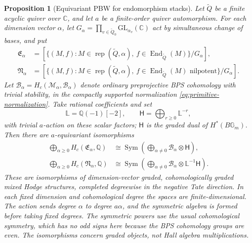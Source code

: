 \documentclass[11pt, reqno]{amsart}
\numberwithin{equation}{section}
\newtheorem{proposition}[theorem]{Proposition}
\theoremstyle{definition}
\theoremstyle{remark}
\newcommand{\op}[1]{\operatorname{#1}}
\newcommand{\mr}[1]{\mathrm{#1}}
\newcommand{\mb}[1]{\mathbb{#1}}
\newcommand{\mc}[1]{\mathcal{#1}}
\newcommand{\ms}[1]{\mathscr{#1}}
\newcommand{\End}{\op{End}}
\newcommand{\Rep}{\op{rep}}
\newcommand{\Qbar}{\widetilde Q}
\newcommand{\iso}{\cong}
\begin{document}
\begin{proposition}[Equivariant PBW for endomorphism stacks]
\label{prop:primitive-pbw}
Let $\Qbar$ be a finite acyclic quiver over $\mb C$, and let $a$
be a finite-order quiver automorphism.
For each dimension vector $\alpha$, let
$G_\alpha=\prod_{v\in\Qbar_0}\mr{GL}_{\alpha_v}(\mb C)$
act by simultaneous change of bases, and put
\begin{align*}
 \mathfrak E_\alpha
  &= [\{(M,f):M\in\Rep(\Qbar,\alpha),\ f\in\End_{\Qbar}(M)\}/G_\alpha],\\
 \mathfrak N_\alpha
  &= [\{(M,f):M\in\Rep(\Qbar,\alpha),\ f\in\End_{\Qbar}(M)
                                      \text{ nilpotent}\}/G_\alpha].
\end{align*}
Let $\mc B_\alpha=H_c(\mc M_\alpha,\ms B_\alpha)$ denote
ordinary preprojective BPS cohomology with trivial stability, in the
compactly supported normalization \eqref{eq:primitive-normalization}. Take rational
coefficients and set
\[ \mb L=\mb Q(-1)[-2],\qquad \mathsf H=\bigoplus_{r\ge0}\mb L^{-r}, \]
with trivial $a$-action on these scalar factors; $\mathsf H$ is the
graded dual of $H^*(B\mb G_m)$. Then there are
$a$-equivariant isomorphisms
\begin{align*}
 \bigoplus_{\alpha\ge0}H_c(\mathfrak E_\alpha,\mb Q)
  &\iso \op{Sym}\left(\bigoplus_{\alpha\ne0}
                            \mc B_\alpha\otimes\mathsf H\right),\\
 \bigoplus_{\alpha\ge0}H_c(\mathfrak N_\alpha,\mb Q)
  &\iso \op{Sym}\left(\bigoplus_{\alpha\ne0}
                   \mc B_\alpha\otimes\mb L^{-1}\mathsf H\right).
\end{align*}
These are isomorphisms of dimension-vector graded, cohomologically
graded mixed Hodge structures, completed degreewise in the negative
Tate direction. In each fixed dimension and cohomological degree the
spaces are finite-dimensional. The action sends degree $\alpha$ to
degree $a\alpha$, and the symmetric algebra is formed before taking
fixed degrees. The symmetric powers use the usual cohomological symmetry, which
has no odd signs here because the BPS cohomology groups are even. The
isomorphisms concern graded objects, not Hall algebra multiplications.
\end{proposition}
\end{document}
